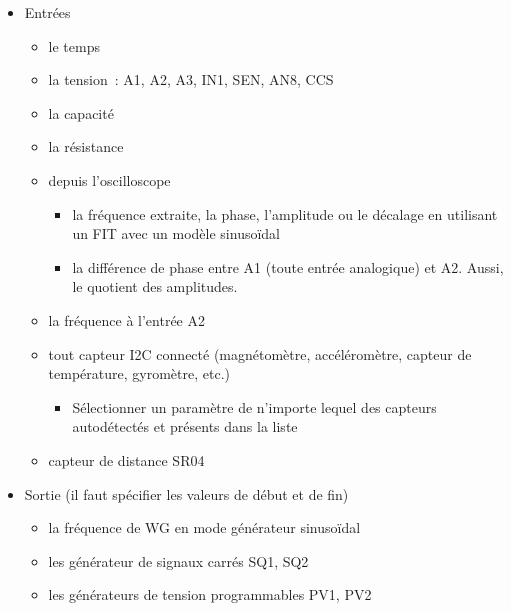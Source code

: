 \documentclass[a4paper,12pt,french]{sphinxmanual}
\begin{document}
\begin{itemize}
\item {} 
Entrées
\begin{itemize}
\item {} 
le temps

\item {} 
la tension : A1, A2, A3, IN1, SEN, AN8, CCS

\item {} 
la capacité

\item {} 
la résistance

\item {} 
depuis l’oscilloscope
\begin{itemize}
\item {} 
la fréquence extraite, la phase, l’amplitude ou le décalage en utilisant un FIT avec un modèle sinusoïdal

\item {} 
la différence de phase entre A1 (toute entrée analogique) et A2. Aussi, le quotient des amplitudes.

\end{itemize}

\item {} 
la fréquence à l’entrée A2

\item {} 
tout capteur I2C connecté (magnétomètre, accéléromètre, capteur de température, gyromètre, etc.)
\begin{itemize}
\item {} 
Sélectionner un paramètre de n’importe lequel des capteurs autodétectés et présents dans la liste

\end{itemize}

\item {} 
capteur de distance SR04

\end{itemize}

\item {} 
Sortie (il faut spécifier les valeurs de début et de fin)
\begin{itemize}
\item {} 
la fréquence de WG en mode générateur sinusoïdal

\item {} 
les générateur de signaux carrés SQ1, SQ2

\item {} 
les générateurs de tension programmables PV1, PV2

\end{itemize}

\end{itemize}
\end{document}
